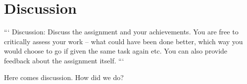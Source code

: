 \section{Discussion}

```
Discussion: Discuss the assignment and your achievements.
You are free to critically assess your work – what could have been done better, which way you would choose to go if given the same task again etc.
You can also provide feedback about the assignment itself.
```

Here comes discussion. How did we do?
